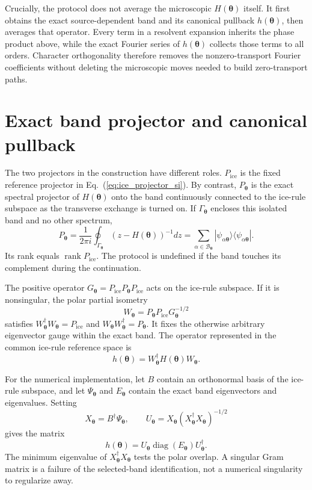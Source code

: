 \documentclass[aps,prl,onecolumn,amsmath,amssymb]{revtex4-2}
\newcommand{\btheta}{\bm\theta}
\newcommand{\Pice}{P_{\mathrm{ice}}}
\begin{document}
Crucially, the protocol does not average the microscopic
$H(\btheta)$ itself.  It first obtains the exact source-dependent band and its
canonical pullback $h(\btheta)$, then averages that operator.  Every term in a
resolvent expansion inherits the phase product above, while the exact Fourier
series of $h(\btheta)$ collects those terms to all orders.  Character
orthogonality therefore removes the nonzero-transport Fourier coefficients
without deleting the microscopic moves needed to build zero-transport paths.

\section{Exact band projector and canonical pullback}

The two projectors in the construction have different roles.  $\Pice$ is the
fixed reference projector in Eq.~(\ref{eq:ice_projector_si}).  By contrast,
$P_{\btheta}$ is the exact spectral projector of $H(\btheta)$ onto the band
continuously connected to the ice-rule subspace as the transverse
exchange is turned on.  If $\Gamma_{\btheta}$ encloses this isolated band and
no other spectrum,
\begin{equation}
 P_{\btheta}=\frac{1}{2\pi i}\oint_{\Gamma_{\btheta}}
 (z-H(\btheta))^{-1}dz
 =\sum_{\alpha\in\mathcal B_{\btheta}}
 |\psi_{\alpha\btheta}\rangle\langle\psi_{\alpha\btheta}|.
\label{eq:spectral_projector_si}
\end{equation}
Its rank equals $\operatorname{rank}\Pice$.  The protocol is undefined if the
band touches its complement during the continuation.

The positive operator
$G_{\btheta}=\Pice P_{\btheta}\Pice$ acts on
the ice-rule subspace.  If it is nonsingular, the polar partial isometry
\begin{equation}
 W_{\btheta}=P_{\btheta}\Pice G_{\btheta}^{-1/2}
\label{eq:polar_si}
\end{equation}
satisfies $W_{\btheta}^\dagger W_{\btheta}=\Pice$ and
$W_{\btheta}W_{\btheta}^\dagger=P_{\btheta}$.  It fixes the otherwise
arbitrary eigenvector gauge within the exact band.  The operator represented
in the common ice-rule reference space is
\begin{equation}
 h(\btheta)=W_{\btheta}^\dagger H(\btheta)W_{\btheta}.
\label{eq:band_si}
\end{equation}

For the numerical implementation, let $B$ contain an orthonormal basis of
the ice-rule subspace, and let $\Psi_{\btheta}$ and $E_{\btheta}$ contain
the exact band eigenvectors and eigenvalues.  Setting
\begin{equation}
 X_{\btheta}=B^\dagger\Psi_{\btheta},\qquad
 U_{\btheta}=X_{\btheta}(X_{\btheta}^\dagger X_{\btheta})^{-1/2}
\end{equation}
gives the matrix
\begin{equation}
 h(\btheta)=U_{\btheta}\operatorname{diag}(E_{\btheta})U_{\btheta}^\dagger.
\label{eq:numerical_band_si}
\end{equation}
The minimum eigenvalue of $X_{\btheta}^\dagger X_{\btheta}$ tests the polar
overlap.  A singular Gram matrix is a failure of the selected-band
identification, not a numerical singularity to regularize away.
\end{document}
